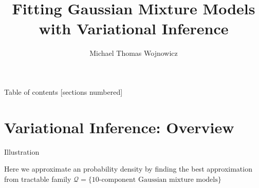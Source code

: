 \documentclass[10pt]{beamer}
\title{Fitting Gaussian Mixture Models with Variational Inference}
\author{Michael Thomas Wojnowicz}
\numberwithin{equation}{section}
\theoremstyle{definition}
\newcommand{\+}[1]{\ensuremath{{\boldsymbol #1}}} %
\newcommand{\Q}{\mathcal{Q}}
\begin{document}
\maketitle

\begin{frame}{Table of contents}
  [sections numbered]
  \tableofcontents[hideallsubsections]
\end{frame}


\section{Variational Inference: Overview}



\begin{frame}{Illustration}

 \begin{minipage}[t][.9\textheight]{\textwidth}
  
Here we approximate an probability density by finding the best approximation from tractable family $\Q = \{ \text{10-component Gaussian mixture models} \}$ 


\end{minipage}
\end{frame}
\end{document}
